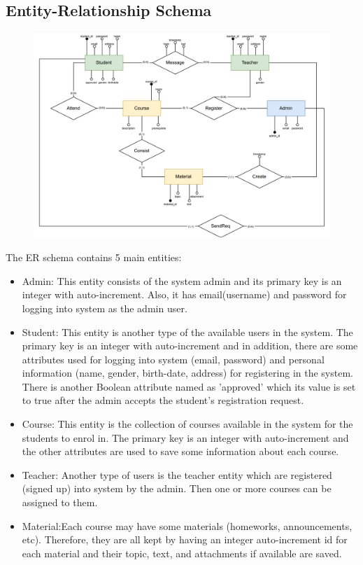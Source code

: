 \subsection{Entity-Relationship Schema}

 \begin{figure}[h!]
   \centering
   \includegraphics[width=17.7cm]{HW_1/images/FINAL-ER.png}
 \end{figure}
 
The ER schema contains 5 main entities:
 \begin{itemize}
  \item Admin: This entity consists of the system admin and its primary key is an integer with auto-increment. Also, it has email(username) and password for logging into system as the admin user.
  \item Student: This entity is another type of the available users in the system. The primary key is an integer with auto-increment and in addition, there are some attributes used for logging into system (email, password) and personal information (name, gender, birth-date, address) for registering in the system. There is another Boolean attribute named as 'approved' which its value is set to true after the admin accepts the student's registration request.
  \item Course: This entity is the collection of courses available in the system for the students to enrol in. The primary key is an integer with auto-increment and the other attributes are used to save some information about each course.
  \item Teacher: Another type of users is the teacher entity which are registered (signed up) into system by the admin. Then one or more courses can be assigned to them.
  \item Material:Each course may have some materials (homeworks, announcements, etc). Therefore, they are all kept by having an integer auto-increment id for each material and their topic, text, and attachments if available are saved.
 \end{itemize}